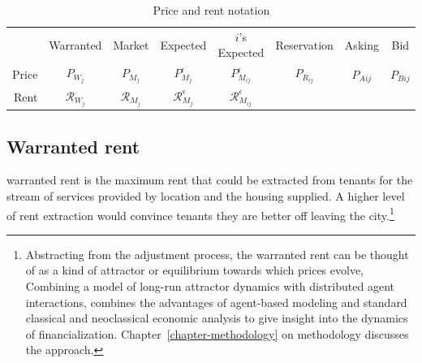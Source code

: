 \begin{table}[!ht]
\centering
{\renewcommand{\arraystretch}{1.6}
\begin{tabular}{r|c|c|c|c|c|c|c|}\cline{2-8}
       & Warranted  & Market & Expected & $i$'s Expected & Reservation & Asking & Bid     \\ \cline{2-8}
Price  & $P_{W_j}$      & $P_{M_j}$  & $P_{M_j}^\epsilon$ & $P_{M_{ij}}^{\epsilon}$     & $P_{R_{ij}}$       & $P_{A{ij}}$  & $P_{B{ij}}$   \\ \cline{2-8}
Rent  & $\mathcal{R}_{W_j}$      & $\mathcal{R}_{M_j}$  & $\mathcal{R}_{M_j}^\epsilon$ & $\mathcal{R}_{M_{ij}}^{\epsilon}$     &       &   &   \\ \cline{2-8}
\end{tabular}
 }   

\caption{Price and rent notation}
\label{table-price-notation}
\end{table}




\subsection{Warranted rent}\label{sec:warranted-rent}
\Gls{warranted rent} is the maximum rent that could be extracted from tenants for the stream of services provided by location and the housing supplied. A higher level of rent extraction would convince tenants they are better off leaving the city.\footnote{Abstracting from the adjustment process, the warranted rent can be thought of as a kind of \gls{attractor} or \gls{equilibrium} towards which prices evolve,  %
Combining a model of long-run attractor dynamics with distributed agent interactions, combines the advantages of agent-based modeling and standard \gls{classical} and \gls{neoclassical} economic analysis to give insight into the dynamics of financialization. Chapter~\ref{chapter-methodology} on methodology discusses the approach.} 

